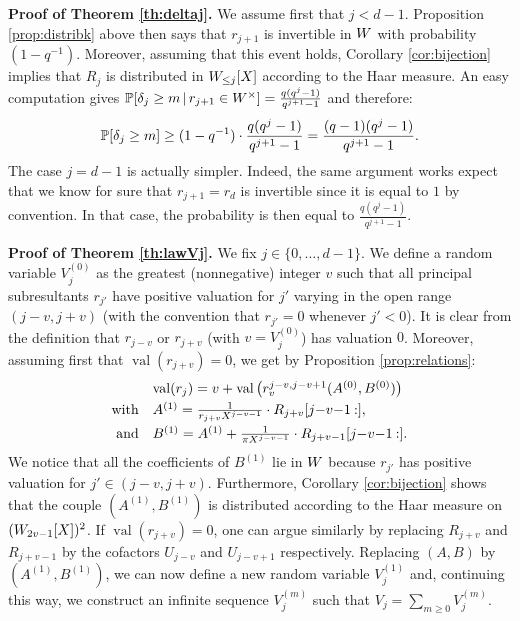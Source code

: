 \documentclass{article}
\DeclareMathOperator{\val}{val}
\begin{document}
\noindent
\textbf{Proof of Theorem \ref{th:deltaj}.}
We assume first that $j < d-1$. Proposition \ref{prop:distribk} above 
then says that $r_{j+1}$ is invertible in $\A$ with probability 
$(1 - q^{-1})$. Moreover, assuming that this event holds, Corollary 
\ref{cor:bijection} implies that $R_j$ is distributed in $\A_{\leq 
j}[X]$ according to the Haar measure. An easy computation gives
$\P[\delta_j \geq m\,|\, r_{j+1} \in \A^\times ] =
\frac{q(q^j - 1)}{q^{j+1}-1}$
and therefore:
$$\P[\delta_j \geq m] \geq (1 - q^{-1}) \cdot
\frac{q(q^j - 1)}{q^{j+1}-1} =
\frac{(q-1)(q^j - 1)}{q^{j+1}-1}.$$
The case $j = d-1$ is actually simpler. Indeed, the same argument works 
expect that we know for sure that $r_{j+1} = r_d$ is invertible since it 
is equal to $1$ by convention. In that case, the probability is then 
equal to $\frac{q(q^j - 1)}{q^{j+1}-1}$.

\medskip

\noindent
\textbf{Proof of Theorem \ref{th:lawVj}.}
We fix $j \in \{0, \ldots, d-1\}$. 
We define a random variable $V_j^{(0)}$ as the greatest (nonnegative) 
integer $v$ such that all principal subresultants $r_{j'}$ have positive 
valuation for $j'$ varying in the open range $(j-v, j+v)$ (with the
convention that $r_{j'} = 0$ whenever $j' < 0$). It is clear from the 
definition that $r_{j-v}$ or $r_{j+v}$ (with $v = V_j^{(0)}$) has 
valuation $0$. Moreover, assuming first that $\val(r_{j+v}) = 0$, we 
get by Proposition \ref{prop:relations}:
$$\begin{array}{rl}
& \val(r_j) = v + \val\big(r_v^{j-v,j-v+1}(A^{(0)}, B^{(0)})\big) 
\smallskip \\
\text{with} &
A^{(1)} = \frac 1 {r_{j+v} X^{j-v-1}} \cdot R_{j+v}[j{-}v{-}1\:{:}], \smallskip \\
\text{and} &
B^{(1)} = A^{(1)} + \frac 1 {\pi X^{j-v-1}} \cdot R_{j+v-1}[j{-}v{-}1\:{:}].
\end{array}$$
We notice that all the coefficients of $B^{(1)}$ lie in $\A$ 
because $r_{j'}$ has positive valuation for $j' \in (j-v, j+v)$.
Furthermore, Corollary \ref{cor:bijection} shows that the 
couple $(A^{(1)}, B^{(1)})$ is distributed according to the Haar measure 
on $(\A_{2v-1}[X])^2$. If $\val(r_{j+v}) = 0$, one can argue similarly 
by replacing $R_{j+v}$ and $R_{j+v-1}$ by the cofactors $U_{j-v}$ and 
$U_{j-v+1}$ respectively. Replacing $(A,B)$ by $(A^{(1)}, B^{(1)})$, we 
can now define a new random variable $V_j^{(1)}$ and, continuing this 
way, we construct an infinite sequence $V_j^{(m)}$ such that
$V_j = \sum_{m \geq 0} V_j^{(m)}$.
\end{document}
